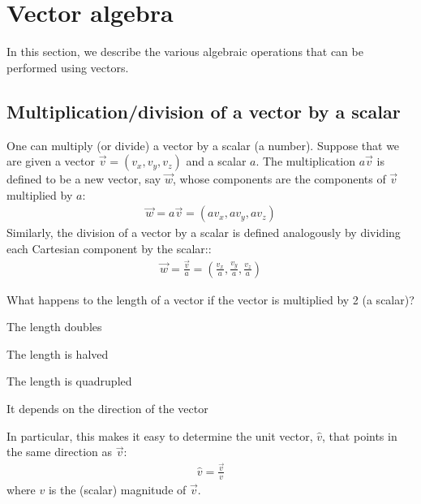 

\section{Vector algebra}
In this section, we describe the various algebraic operations that can be performed using vectors. 
\subsection{Multiplication/division of a vector by a scalar}
One can multiply (or divide) a vector by a scalar (a number). Suppose that we are given a vector $\vec v=(v_x, v_y, v_z)$ and a scalar $a$. The multiplication $a\vec v$ is defined to be a new vector, say $\vec w$, whose components are the components of $\vec v$ multiplied by $a$:
\begin{align*}
\vec w = a\vec v = (av_x, a v_y, av_z)
\end{align*}
Similarly, the division of a vector by a scalar is defined analogously by dividing each Cartesian component by the scalar::
\begin{align*}
\vec w = \frac{\vec v}{a} = \left(\frac{v_x}{a}, \frac{v_y}{a}, \frac{v_z}{a}\right)
\end{align*}
\begin{checkpoint}
\begin{MCquestion}
{What happens to the length of a vector if the vector is multiplied by 2 (a scalar)?}
\item The length doubles \correct
\item The length is halved
\item The length is quadrupled
\item It depends on the direction of the vector
\end{MCquestion}
\end{checkpoint}

In particular, this makes it easy to determine the unit vector, $\hat v$, that points in the same direction as $\vec v$:
\begin{align*}
\hat v = \frac{\vec v}{v}
\end{align*}
where $v$ is the (scalar) magnitude of $\vec v$. 

